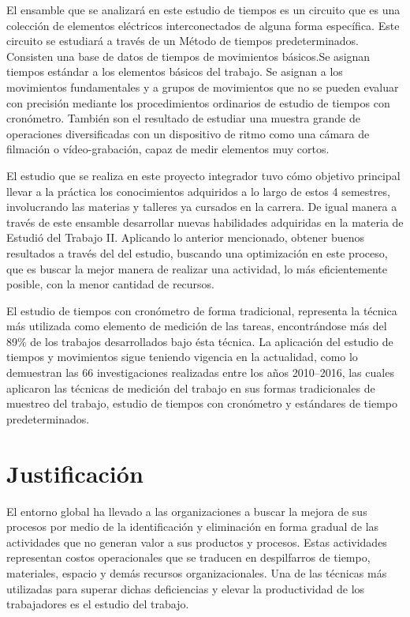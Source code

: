    El ensamble que se analizará en este estudio de tiempos es un circuito  que es una colección de elementos eléctricos interconectados de alguna forma específica. Este circuito se estudiará a través de un Método de tiempos predeterminados. Consisten una base de datos de tiempos de movimientos básicos.Se asignan tiempos estándar a los elementos básicos del trabajo. Se asignan a los movimientos fundamentales y a grupos de movimientos que no se pueden evaluar con precisión mediante los procedimientos ordinarios de estudio de tiempos con cronómetro. También son el resultado de estudiar una muestra grande de operaciones diversificadas con un dispositivo de ritmo como una cámara de filmación o vídeo-grabación, capaz de medir elementos muy cortos.
    
    El estudio que se realiza en este proyecto integrador tuvo cómo objetivo principal llevar a la práctica los conocimientos adquiridos a lo largo de estos 4 semestres, involucrando las materias y talleres ya cursados en la carrera. De igual manera a través de este ensamble desarrollar nuevas habilidades adquiridas en la materia de Estudió del Trabajo II. Aplicando lo anterior mencionado, obtener buenos resultados a través del del estudio, buscando  una optimización en este proceso, que es buscar la mejor manera de realizar una actividad, lo más eficientemente posible, con la menor cantidad de recursos.
    
    El estudio de tiempos con cronómetro de forma tradicional, representa la técnica más utilizada como elemento de medición de las tareas, encontrándose más del 89\% de los trabajos desarrollados bajo ésta técnica.
    La aplicación del estudio de tiempos y movimientos sigue teniendo vigencia en la actualidad, como lo demuestran las 66 investigaciones realizadas entre los años 2010–2016, las cuales aplicaron las técnicas de medición del trabajo en sus formas tradicionales de muestreo del trabajo, estudio de tiempos con cronómetro y estándares de tiempo predeterminados.
    
     
    \section{Justificación}
    
    El entorno global ha llevado a las organizaciones a buscar la mejora de sus procesos por medio de la identificación y eliminación en forma gradual de las actividades que no generan valor a sus productos y procesos. Estas actividades representan costos operacionales que se traducen en despilfarros de tiempo, materiales, espacio y demás recursos organizacionales. Una de las técnicas más utilizadas para superar dichas deficiencias y elevar la productividad de los trabajadores es el estudio del trabajo.
        
